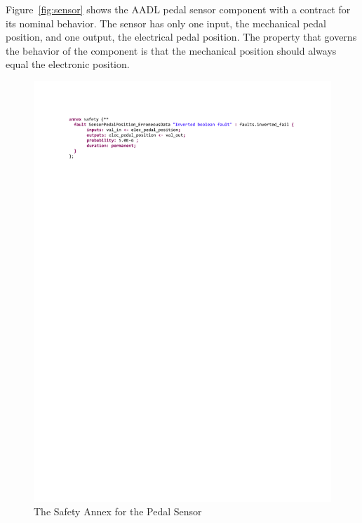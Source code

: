 Figure~\ref{fig:sensor} shows the AADL pedal sensor component with a contract for its nominal behavior. The sensor has only one input, the mechanical pedal position, and one output, the electrical pedal position. The property that governs the behavior of the component is that the mechanical position should always equal the electronic position. 

\begin{figure}[h!]
	\hspace*{-2cm}
	\vspace{-0.4in} 
	\begin{center}
		\includegraphics[trim=0 690 -10 70,clip,width=1.5\dimexpr\textwidth-2cm\relax]{images/safetyannex_sensorfault.pdf}
		\caption{The Safety Annex for the Pedal Sensor}
		\label{fig:sensorFault}
	\end{center}
	\vspace{-0.3in}
\end{figure}

